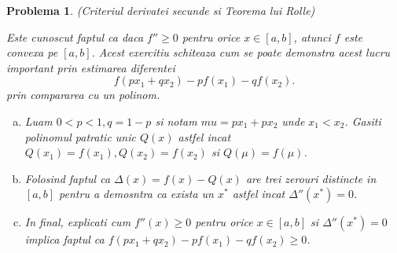 \documentclass[a4paper,12pt,oneside]{report}
\newtheorem{problem}{Problema}
\begin{document}
\begin{problem} (Criteriul derivatei secunde si Teorema lui Rolle)
	
Este cunoscut faptul ca daca \({f}'' \geq 0\) pentru orice \(x\in \left [ a,b \right ]\), atunci \(f\) este convexa pe \(\left [ a,b \right ]\). Acest exercitiu schiteaza cum se poate demonstra acest lucru important prin estimarea diferentei
\begin{displaymath}
  f\left ( px_{1} + qx_{2}\right ) - pf\left ( x_{1} \right ) - qf\left ( x_{2} \right ).
\end{displaymath}
 prin compararea cu un polinom.
 \begin{enumerate}[a)]
\item Luam \(0< p < 1, q = 1-p\) si notam \(mu = px_{1} + px_{2}\) unde \(x_{1} < x_{2}\).  Gasiti polinomul patratic unic \(Q\left ( x \right )\) astfel incat  \(Q\left ( x_{1} \right ) = f\left ( x_{1} \right ), Q\left ( x_{2} \right ) = f\left ( x_{2} \right )\) si \(Q\left ( \mu  \right ) = f\left ( \mu  \right )\).
\item Folosind faptul ca \(\Delta \left ( x \right ) =  f\left ( x \right ) - Q\left ( x \right )\) are trei zerouri distincte in \(\left [ a,b \right ]\) pentru a demosntra ca exista un \(x^{*}\) astfel incat \({\Delta }''\left ( x^{*} \right ) = 0\).
\item In final, explicati cum \({f}''\left ( x \right ) \geq 0\) pentru orice \(x\in \left [ a,b \right ]\) si \({\Delta }''\left ( x^{*} \right ) = 0\) implica faptul ca \(f\left ( px_{1} + qx_{2} \right ) - pf\left ( x_{1} \right ) - qf\left ( x_{2} \right ) \geq 0\).
\end{enumerate}
\end{problem}
\end{document}
